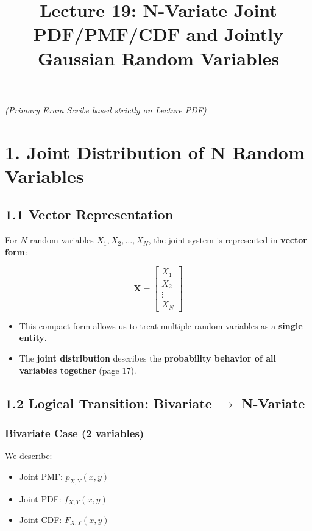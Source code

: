 \documentclass[11pt]{article}
\title{\textbf{Lecture 19: N-Variate Joint PDF/PMF/CDF and Jointly Gaussian Random Variables}}
\date{}
\begin{document}
\maketitle

\textit{(Primary Exam Scribe based strictly on Lecture PDF)}

\section*{1. Joint Distribution of N Random Variables}

\subsection*{1.1 Vector Representation}

For $N$ random variables $X_1, X_2, \dots, X_N$, the joint system is represented in \textbf{vector form}:

\[
\mathbf{X} =
\begin{bmatrix}
X_1 \\
X_2 \\
\vdots \\
X_N
\end{bmatrix}
\]

\begin{itemize}
\item This compact form allows us to treat multiple random variables as a \textbf{single entity}.
\item The \textbf{joint distribution} describes the \textbf{probability behavior of all variables together} (page 17).
\end{itemize}

\subsection*{1.2 Logical Transition: Bivariate $\rightarrow$ N-Variate}

\subsubsection*{Bivariate Case (2 variables)}

We describe:

\begin{itemize}
\item Joint PMF: $p_{X,Y}(x,y)$
\item Joint PDF: $f_{X,Y}(x,y)$
\item Joint CDF: $F_{X,Y}(x,y)$
\end{itemize}
\end{document}
